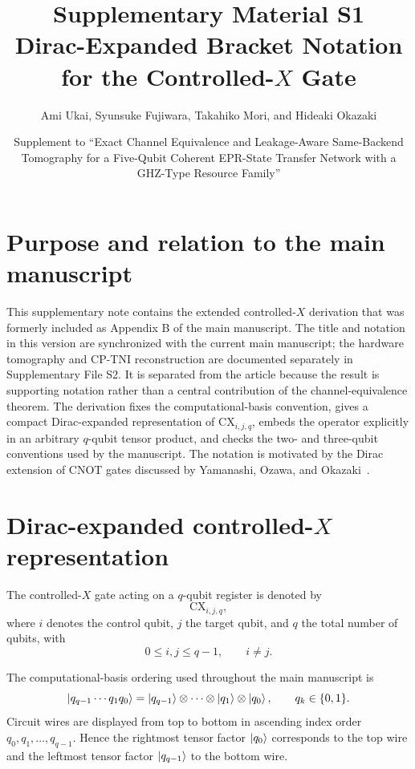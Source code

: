 \documentclass[11pt,a4paper]{article}
\title{Supplementary Material S1\\[1mm]
\large Dirac-Expanded Bracket Notation for the Controlled-$X$ Gate}
\author{Ami Ukai, Syunsuke Fujiwara, Takahiko Mori, and Hideaki Okazaki}
\date{Supplement to ``Exact Channel Equivalence and Leakage-Aware Same-Backend Tomography for a Five-Qubit Coherent EPR-State Transfer Network with a GHZ-Type Resource Family''}
\newcommand{\CX}{\mathrm{CX}}
\begin{document}
\maketitle

\section*{Purpose and relation to the main manuscript}
This supplementary note contains the extended controlled-$X$ derivation that was formerly included as Appendix B of the main manuscript.  The title and notation in this version are synchronized with the current main manuscript; the hardware tomography and CP-TNI reconstruction are documented separately in Supplementary File S2.  It is separated from the article because the result is supporting notation rather than a central contribution of the channel-equivalence theorem.  The derivation fixes the computational-basis convention, gives a compact Dirac-expanded representation of $\CX_{i,j,q}$, embeds the operator explicitly in an arbitrary $q$-qubit tensor product, and checks the two- and three-qubit conventions used by the manuscript.  The notation is motivated by the Dirac extension of CNOT gates discussed by Yamanashi, Ozawa, and Okazaki~\cite{Yamanashi2023}.

\section{Dirac-expanded controlled-$X$ representation}

The controlled-$X$ gate acting on a $q$-qubit register is denoted by
\begin{equation}
\boxed{\CX_{i,j,q}},
\end{equation}
where $i$ denotes the control qubit, $j$ the target qubit, and $q$ the total number of qubits, with
\begin{equation}
0\le i,j\le q-1,\qquad i\neq j.
\end{equation}

The computational-basis ordering used throughout the main manuscript is
\begin{equation}
\ket{q_{q-1}\cdots q_1q_0}
=
\ket{q_{q-1}}\otimes\cdots\otimes\ket{q_1}\otimes\ket{q_0},
\qquad q_k\in\{0,1\}.
\label{eq:Sordering}
\end{equation}
Circuit wires are displayed from top to bottom in ascending index order $q_0,q_1,\ldots,q_{q-1}$.  Hence the rightmost tensor factor $\ket{q_0}$ corresponds to the top wire and the leftmost tensor factor $\ket{q_{q-1}}$ to the bottom wire.
\end{document}
